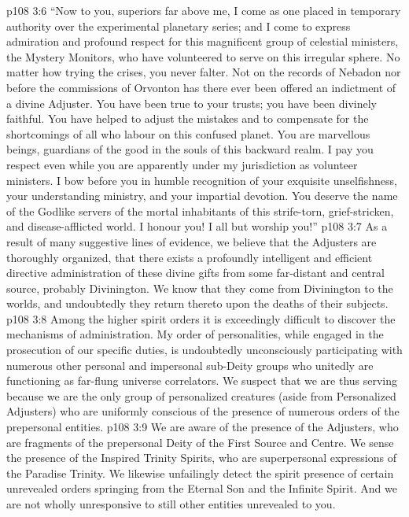 \vs p108 3:6 “Now to you, superiors far above me, I come as one placed in temporary authority over the experimental planetary series; and I come to express admiration and profound respect for this magnificent group of celestial ministers, the Mystery Monitors, who have volunteered to serve on this irregular sphere. No matter how trying the crises, you never falter. Not on the records of Nebadon nor before the commissions of Orvonton has there ever been offered an indictment of a divine Adjuster. You have been true to your trusts; you have been divinely faithful. You have helped to adjust the mistakes and to compensate for the shortcomings of all who labour on this confused planet. You are marvellous beings, guardians of the good in the souls of this backward realm. I pay you respect even while you are apparently under my jurisdiction as volunteer ministers. I bow before you in humble recognition of your exquisite unselfishness, your understanding ministry, and your impartial devotion. You deserve the name of the Godlike servers of the mortal inhabitants of this strife\hyp{}torn, grief\hyp{}stricken, and disease\hyp{}afflicted world. I honour you! I all but worship you!”
\vs p108 3:7 \pc As a result of many suggestive lines of evidence, we believe that the Adjusters are thoroughly organized, that there exists a profoundly intelligent and efficient directive administration of these divine gifts from some far\hyp{}distant and central source, probably Divinington. We know that they come from Divinington to the worlds, and undoubtedly they return thereto upon the deaths of their subjects.
\vs p108 3:8 Among the higher spirit orders it is exceedingly difficult to discover the mechanisms of administration. My order of personalities, while engaged in the prosecution of our specific duties, is undoubtedly unconsciously participating with numerous other personal and impersonal sub\hyp{}Deity groups who unitedly are functioning as far\hyp{}flung universe correlators. We suspect that we are thus serving because we are the only group of personalized creatures (aside from Personalized Adjusters) who are uniformly conscious of the presence of numerous orders of the prepersonal entities.
\vs p108 3:9 We are aware of the presence of the Adjusters, who are fragments of the prepersonal Deity of the First Source and Centre. We sense the presence of the Inspired Trinity Spirits, who are superpersonal expressions of the Paradise Trinity. We likewise unfailingly detect the spirit presence of certain unrevealed orders springing from the Eternal Son and the Infinite Spirit. And we are not wholly unresponsive to still other entities unrevealed to you.
